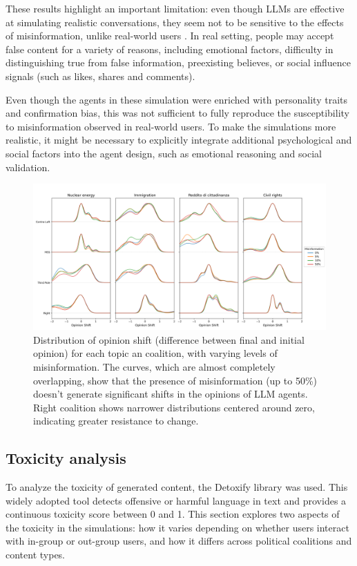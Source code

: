 These results highlight an important limitation: even though LLMs are effective at simulating realistic conversations, they seem not to be sensitive to the effects of misinformation, unlike real-world users \cite{aimeur2023fake}.
In real setting, people may accept false content for a variety of reasons, including emotional factors, difficulty in distinguishing true from false information, preexisting believes, or social influence signals (such as likes, shares and comments).

Even though the agents in these simulation were enriched with personality traits and confirmation bias, this was not sufficient to fully reproduce the susceptibility to misinformation observed in real-world users.
To make the simulations more realistic, it might be necessary to explicitly integrate additional psychological and social factors into the agent design, such as emotional reasoning and social validation.


\begin{figure}[h]
    \centering
    \includegraphics[width=0.8\linewidth]{Images/Misinformation/score_llm_RandomRecSys.png}
    \caption{
    Distribution of opinion shift (difference between final and initial opinion) for each topic an coalition, with varying levels of misinformation.
    The curves, which are almost completely overlapping, show that the presence of misinformation (up to 50\%) doesn't generate significant shifts in the opinions of LLM agents.
    Right coalition shows narrower distributions centered around zero, indicating greater resistance to change.
    }
    \label{fig:misinfo_opinion_shift}
\end{figure}


\subsection{Toxicity analysis}
To analyze the toxicity of generated content, the Detoxify library \cite{hanu2020detoxify} was used. This widely adopted tool detects offensive or harmful language in text and provides a continuous toxicity score between 0 and 1.
This section explores two aspects of the toxicity in the simulations: how it varies depending on whether users interact with in-group or out-group users, and how it differs across political coalitions and content types.

